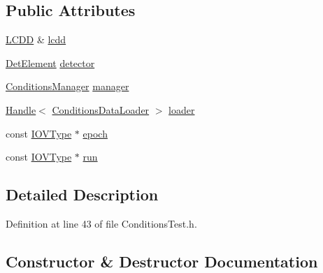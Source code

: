 \subsection*{Public Attributes}
\begin{DoxyCompactItemize}
\item 
\hyperlink{class_d_d4hep_1_1_geometry_1_1_l_c_d_d}{L\+C\+DD} \& \hyperlink{struct_d_d4hep_1_1_conditions_1_1_test_1_1_test_env_a6939ff406dbff1ad30aa6ce492dc3ebf}{lcdd}
\item 
\hyperlink{class_d_d4hep_1_1_geometry_1_1_det_element}{Det\+Element} \hyperlink{struct_d_d4hep_1_1_conditions_1_1_test_1_1_test_env_a08451dbdbf34ecff0e383bb617f78c29}{detector}
\item 
\hyperlink{class_d_d4hep_1_1_conditions_1_1_conditions_manager}{Conditions\+Manager} \hyperlink{struct_d_d4hep_1_1_conditions_1_1_test_1_1_test_env_aadbe3c1f12fe6972edbf18f58359a107}{manager}
\item 
\hyperlink{class_d_d4hep_1_1_handle}{Handle}$<$ \hyperlink{class_d_d4hep_1_1_conditions_1_1_conditions_data_loader}{Conditions\+Data\+Loader} $>$ \hyperlink{struct_d_d4hep_1_1_conditions_1_1_test_1_1_test_env_acf0847e9018a0793ef805d2a16b033a5}{loader}
\item 
const \hyperlink{class_d_d4hep_1_1_i_o_v_type}{I\+O\+V\+Type} $\ast$ \hyperlink{struct_d_d4hep_1_1_conditions_1_1_test_1_1_test_env_a71fce3b33ebcdf5f35f433f88e6ab9d6}{epoch}
\item 
const \hyperlink{class_d_d4hep_1_1_i_o_v_type}{I\+O\+V\+Type} $\ast$ \hyperlink{struct_d_d4hep_1_1_conditions_1_1_test_1_1_test_env_adf17ffc8d010573be87030ddc963d947}{run}
\end{DoxyCompactItemize}


\subsection{Detailed Description}


Definition at line 43 of file Conditions\+Test.\+h.



\subsection{Constructor \& Destructor Documentation}
\hypertarget{struct_d_d4hep_1_1_conditions_1_1_test_1_1_test_env_aff745acacf911b4d00b75b7b40816d68}{}\label{struct_d_d4hep_1_1_conditions_1_1_test_1_1_test_env_aff745acacf911b4d00b75b7b40816d68} 
